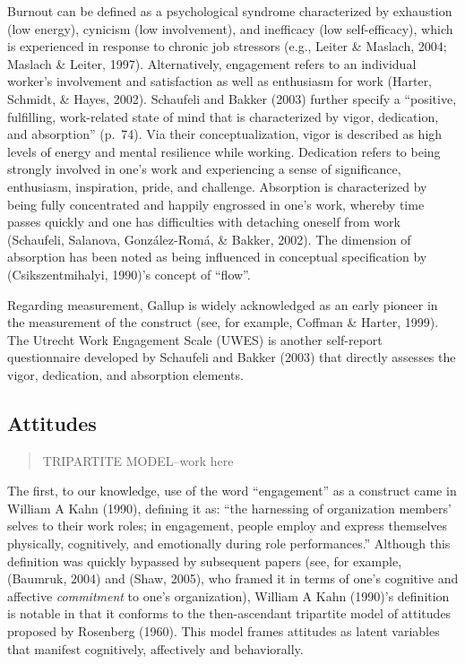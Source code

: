 \documentclass[
  english,
  man]{apa6}
\begin{document}
Burnout can be defined as a psychological syndrome characterized by exhaustion (low energy), cynicism (low involvement), and inefficacy (low self-efficacy), which is experienced in response to chronic job stressors (e.g., Leiter \& Maslach, 2004; Maslach \& Leiter, 1997). Alternatively, engagement refers to an individual worker's involvement and satisfaction as well as enthusiasm for work (Harter, Schmidt, \& Hayes, 2002). Schaufeli and Bakker (2003) further specify a \enquote{positive, fulfilling, work-related state of mind that is characterized by vigor, dedication, and absorption} (p.~74). Via their conceptualization, vigor is described as high levels of energy and mental resilience while working. Dedication refers to being strongly involved in one's work and experiencing a sense of significance, enthusiasm, inspiration, pride, and challenge. Absorption is characterized by being fully concentrated and happily engrossed in one's work, whereby time passes quickly and one has difficulties with detaching oneself from work (Schaufeli, Salanova, González-Romá, \& Bakker, 2002). The dimension of absorption has been noted as being influenced in conceptual specification by (Csikszentmihalyi, 1990)'s concept of \enquote{flow}.

Regarding measurement, Gallup is widely acknowledged as an early pioneer in the measurement of the construct (see, for example, Coffman \& Harter, 1999). The Utrecht Work Engagement Scale (UWES) is another self-report questionnaire developed by Schaufeli and Bakker (2003) that directly assesses the vigor, dedication, and absorption elements.

\hypertarget{attitudes}{%
\subsection{Attitudes}\label{attitudes}}

\begin{quote}
TRIPARTITE MODEL--work here
\end{quote}

The first, to our knowledge, use of the word \enquote{engagement} as a construct came in William A Kahn (1990), defining it as: \enquote{the harnessing of organization members' selves to their work roles; in engagement, people employ and express themselves physically, cognitively, and emotionally during role performances.} Although this definition was quickly bypassed by subsequent papers (see, for example, (Baumruk, 2004) and (Shaw, 2005), who framed it in terms of one's cognitive and affective \emph{commitment} to one's organization), William A Kahn (1990)'s definition is notable in that it conforms to the then-ascendant tripartite model of attitudes proposed by Rosenberg (1960). This model frames attitudes as latent variables that manifest cognitively, affectively and behaviorally.
\end{document}
